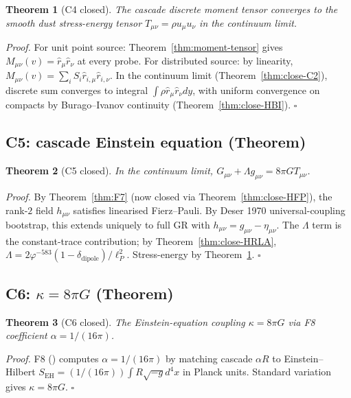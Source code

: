 \documentclass[11pt]{article}
\theoremstyle{plain}
\newtheorem{theorem}{Theorem}[section]
\theoremstyle{definition}
\theoremstyle{remark}
\begin{document}
\begin{theorem}[C4 closed]\label{thm:close-C4}
The cascade discrete moment tensor converges to the smooth dust stress-energy tensor $T_{\mu\nu} = \rho u_\mu u_\nu$ in the continuum limit.
\end{theorem}

\noindent\emph{Proof.}
For unit point source: Theorem~\ref{thm:moment-tensor} gives $M_{\mu\nu}(v) = \hat r_\mu \hat r_\nu$ at every probe. For distributed source: by linearity, $M_{\mu\nu}(v) = \sum_i S_i \hat r_{i,\mu} \hat r_{i,\nu}$. In the continuum limit (Theorem~\ref{thm:close-C2}), discrete sum converges to integral $\int \rho \hat r_\mu \hat r_\nu dy$, with uniform convergence on compacts by Burago--Ivanov continuity (Theorem~\ref{thm:close-HBI}). \hfill$\square$

\subsection{C5: cascade Einstein equation (Theorem)}\label{sec:close-C5}

\begin{theorem}[C5 closed]\label{thm:close-C5}
In the continuum limit, $G_{\mu\nu} + \Lambda g_{\mu\nu} = 8\pi G T_{\mu\nu}$.
\end{theorem}

\noindent\emph{Proof.}
By Theorem~\ref{thm:F7} (now closed via Theorem~\ref{thm:close-HFP}), the rank-$2$ field $h_{\mu\nu}$ satisfies linearised Fierz--Pauli. By Deser 1970 universal-coupling bootstrap, this extends uniquely to full GR with $h_{\mu\nu} = g_{\mu\nu} - \eta_{\mu\nu}$. The $\Lambda$ term is the constant-trace contribution; by Theorem~\ref{thm:close-HRLA}, $\Lambda = 2\varphi^{-583}(1 - \delta_\mathrm{dipole})/\ell_P^2$. Stress-energy by Theorem~\ref{thm:close-C4}. \hfill$\square$

\subsection{C6: $\kappa = 8\pi G$ (Theorem)}\label{sec:close-C6}

\begin{theorem}[C6 closed]\label{thm:close-C6}
The Einstein-equation coupling $\kappa = 8\pi G$ via F8 coefficient $\alpha = 1/(16\pi)$.
\end{theorem}

\noindent\emph{Proof.}
F8 (\citealp{SmartXXXVI}) computes $\alpha = 1/(16\pi)$ by matching cascade $\alpha R$ to Einstein--Hilbert $S_{\mathrm{EH}} = (1/(16\pi)) \int R \sqrt{-g} d^4x$ in Planck units. Standard variation gives $\kappa = 8\pi G$. \hfill$\square$
\end{document}
